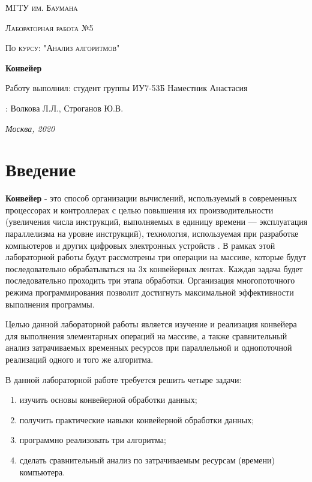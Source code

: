 \documentclass[12pt]{report}
\begin{document}
 
\begin{titlepage}
	\centering
	{\scshape\LARGE МГТУ им. Баумана \par}
	\vspace{3cm}
	{\scshape\Large Лабораторная работа №5\par}
	\vspace{0.5cm}	
	{\scshape\Large По курсу: "Анализ алгоритмов"\par}
	\vspace{1.5cm}
	{\huge\bfseries Конвейер\par}
	\vspace{2cm}
	\Large Работу выполнил: студент группы ИУ7-53Б Наместник Анастасия\par
	\vspace{0.5cm}
	:  Волкова Л.Л., Строганов Ю.В.\par

	\vfill
	\large \textit {Москва, 2020} \par
\end{titlepage}

\tableofcontents

\newpage
\chapter*{Введение}

	\textbf{Конвейер} - это способ организации вычислений, используемый в современных процессорах и контроллерах с целью повышения их производительности (увеличения числа инструкций, выполняемых в единицу времени — эксплуатация параллелизма на уровне инструкций), технология, используемая при разработке компьютеров и других цифровых электронных устройств \cite{Conveyer}.
В рамках этой лабораторной работы будут рассмотрены три операции на массиве, которые будут последовательно обрабатываться на 3х конвейерных лентах. Каждая задача
будет последовательно проходить три этапа обработки. Организация многопоточного режима программирования позволит достигнуть максимальной эффективности выполнения программы.

	Целью данной лабораторной работы является изучение и реализация конвейера для выполнения элементарных операций на массиве, а также сравнительный анализ затрачиваемых временных ресурсов при параллельной и однопоточной реализаций одного и того же алгоритма.

В данной лабораторной работе требуется решить четыре задачи:
\begin{enumerate}
\item изучить основы конвейерной обработки данных;
\item  получить практические навыки конвейерной обработки данных;
\item программно реализовать три алгоритма;
\item сделать сравнительный анализ по затрачиваемым ресурсам (времени) компьютера.
\end{enumerate}
\end{document}
